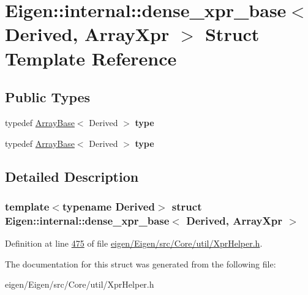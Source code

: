 \hypertarget{struct_eigen_1_1internal_1_1dense__xpr__base_3_01_derived_00_01_array_xpr_01_4}{}\section{Eigen\+:\+:internal\+:\+:dense\+\_\+xpr\+\_\+base$<$ Derived, Array\+Xpr $>$ Struct Template Reference}
\label{struct_eigen_1_1internal_1_1dense__xpr__base_3_01_derived_00_01_array_xpr_01_4}
\subsection*{Public Types}
\begin{DoxyCompactItemize}
\item 
\mbox{\label{struct_eigen_1_1internal_1_1dense__xpr__base_3_01_derived_00_01_array_xpr_01_4_a49f2e9d731521e50359b783cb87b63c7}} 
typedef \hyperlink{group___core___module_class_eigen_1_1_array_base}{Array\+Base}$<$ Derived $>$ {\bfseries type}
\item 
\mbox{\label{struct_eigen_1_1internal_1_1dense__xpr__base_3_01_derived_00_01_array_xpr_01_4_a49f2e9d731521e50359b783cb87b63c7}} 
typedef \hyperlink{group___core___module_class_eigen_1_1_array_base}{Array\+Base}$<$ Derived $>$ {\bfseries type}
\end{DoxyCompactItemize}


\subsection{Detailed Description}
\subsubsection*{template$<$typename Derived$>$\newline
struct Eigen\+::internal\+::dense\+\_\+xpr\+\_\+base$<$ Derived, Array\+Xpr $>$}



Definition at line \hyperlink{eigen_2_eigen_2src_2_core_2util_2_xpr_helper_8h_source_l00475}{475} of file \hyperlink{eigen_2_eigen_2src_2_core_2util_2_xpr_helper_8h_source}{eigen/\+Eigen/src/\+Core/util/\+Xpr\+Helper.\+h}.



The documentation for this struct was generated from the following file\+:\begin{DoxyCompactItemize}
\item 
eigen/\+Eigen/src/\+Core/util/\+Xpr\+Helper.\+h\end{DoxyCompactItemize}
